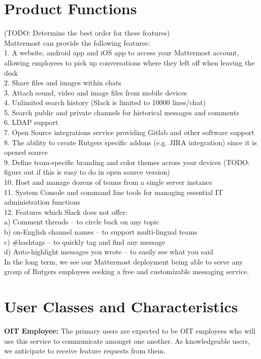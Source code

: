 \documentclass{scrreprt}
\newcommand\tab[1][0.5cm]{\hspace*{#1}}
\begin{document}
\section{Product Functions}
(TODO: Determine the best order for these features)\\
Mattermost can provide the following features:\\
\tab 1. A website, android app and iOS app to access your Mattermost
account, allowing \tab employees to pick up conversations where they left off when
leaving the desk\\
\tab 2. Share files and images within chats\\
\tab 3. Attach sound, video and image files from mobile devices\\
\tab 4. Unlimited search history (Slack is limited to 10000 lines/chat)\\
\tab 5. Search public and private channels for historical messages and
comments\\
\tab 6. LDAP support\\
\tab 7. Open Source integrations service providing Gitlab and other software
support\\
\tab 8. The ability to create Rutgers specific addons (e.g. JIRA integration) since
it is \tab opened source\\
\tab 9. Define team-specific branding and color themes across your devices (TODO:
figure \tab out if this is easy to do in open source version)\\
\tab 10. Host and manage dozens of teams from a single server instance\\
\tab 11. System Console and command line tools for managing essential IT
administration \tab functions\\
\tab 12. Features which Slack does not offer:\\
\tab\tab a) Comment threads – to circle back on any topic\\
\tab\tab b) on-English channel names – to support multi-lingual teams\\
\tab\tab c) \#hashtags – to quickly tag and find any message\\
\tab\tab d) Auto-highlight messages you wrote – to easily see what you said\\

In the long term, we see our Mattermost deployment being able to serve any group
of Rutgers employees seeking a free and customizable messaging service.

\section{User Classes and Characteristics}
\textbf{OIT Employee:}
\tab The primary users are expected to be OIT employees who will use this
service to communicate amongst one another.  As knowledgeable users, we
anticipate to receive feature requests from them.\\
\end{document}
